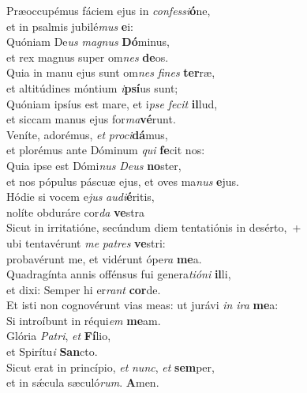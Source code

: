 \evenverse Præoccupémus fáciem ejus in \textit{con}\textit{fes}\textit{si}\textbf{ó}ne,~\*\\
\evenverse et in psalmis jubilé\textit{mus} \textbf{e}i:\\
\oddverse Quóniam De\textit{us} \textit{ma}\textit{gnus} \textbf{Dó}minus,~\*\\
\oddverse et rex magnus super om\textit{nes} \textbf{de}os.\\
\evenverse Quia in manu ejus sunt om\textit{nes} \textit{fi}\textit{nes} \textbf{ter}ræ,~\*\\
\evenverse et altitúdines móntium \textit{i}\textbf{psí}us sunt;\\
\oddverse Quóniam ipsíus est mare, et i\textit{pse} \textit{fe}\textit{cit} \textbf{il}lud,~\*\\
\oddverse et siccam manus ejus for\textit{ma}\textbf{vé}runt.\\
\evenverse Veníte, adorémus, \textit{et} \textit{pro}\textit{ci}\textbf{dá}mus,~\*\\
\evenverse et plorémus ante Dóminum \textit{qui} \textbf{fe}cit nos:\\
\oddverse Quia ipse est Dómi\textit{nus} \textit{De}\textit{us} \textbf{no}ster,~\*\\
\oddverse et nos pópulus páscuæ ejus, et oves ma\textit{nus} \textbf{e}jus.\\
\evenverse Hódie si vocem e\textit{jus} \textit{au}\textit{di}\textbf{é}ritis,~\*\\
\evenverse nolíte obduráre cor\textit{da} \textbf{ve}stra\\
\oddverse Sicut in irritatióne, secúndum diem tentatiónis in desérto,~+\\
\oddverse  ubi tentavérunt \textit{me} \textit{pa}\textit{tres} \textbf{ve}stri:~\*\\
\oddverse probavérunt me, et vidérunt ópe\textit{ra} \textbf{me}a.\\
\evenverse Quadragínta annis offénsus fui genera\textit{ti}\textit{ó}\textit{ni} \textbf{il}li,~\*\\
\evenverse et dixi: Semper hi er\textit{rant} \textbf{cor}de.\\
\oddverse Et isti non cognovérunt vias meas: ut jurávi \textit{in} \textit{i}\textit{ra} \textbf{me}a:~\*\\
\oddverse Si introíbunt in réqui\textit{em} \textbf{me}am.\\
\evenverse Glória \textit{Pa}\textit{tri}, \textit{et} \textbf{Fí}lio,~\*\\
\evenverse et Spirítu\textit{i} \textbf{San}cto.\\
\oddverse Sicut erat in princípio, \textit{et} \textit{nunc}, \textit{et} \textbf{sem}per,~\*\\
\oddverse et in sǽcula sæculó\textit{rum}. \textbf{A}men.\\
